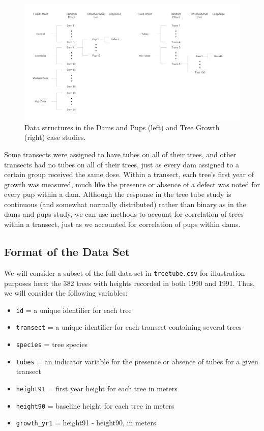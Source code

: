 \documentclass[
]{krantz}
\providecommand{\tightlist}{%
  \setlength{\itemsep}{0pt}\setlength{\parskip}{0pt}}
\begin{document}
\begin{figure}
\includegraphics[width=0.8\linewidth,height=1.25\textheight]{data/DamsTreesStructure} \caption{Data structures in the Dams and Pups (left) and Tree Growth (right) case studies.}\label{fig:DamsTreesStructure}
\end{figure}

Some transects were assigned to have tubes on all of their trees, and other transects had no tubes on all of their trees, just as every dam assigned to a certain group received the same dose. Within a transect, each tree's first year of growth was measured, much like the presence or absence of a defect was noted for every pup within a dam. Although the response in the tree tube study is continuous (and somewhat normally distributed) rather than binary as in the dams and pups study, we can use methods to account for correlation of trees within a transect, just as we accounted for correlation of pups within dams.

\subsection{Format of the Data Set}\label{format-of-the-data-set}

We will consider a subset of the full data set in \texttt{treetube.csv} for illustration purposes here: the 382 trees with heights recorded in both 1990 and 1991. Thus, we will consider the following variables:

\begin{itemize}
\tightlist
\item
  \texttt{id} = a unique identifier for each tree
\item
  \texttt{transect} = a unique identifier for each transect containing several trees
\item
  \texttt{species} = tree species
\item
  \texttt{tubes} = an indicator variable for the presence or absence of tubes for a given transect
\item
  \texttt{height91} = first year height for each tree in meters
\item
  \texttt{height90} = baseline height for each tree in meters
\item
  \texttt{growth\_yr1} = height91 - height90, in meters
\end{itemize}
\end{document}
